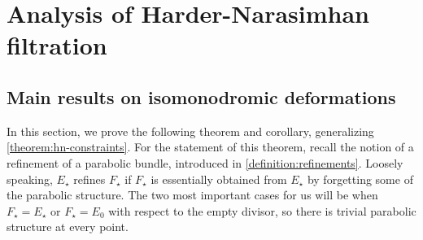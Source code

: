 \documentclass[12 pt]{amsart}
\theoremstyle{plain}
\theoremstyle{definition}
\theoremstyle{remark}
\numberwithin{equation}{section}
\begin{document}
\section{Analysis of Harder-Narasimhan filtration}
\label{section:hn-filtration}

\subsection{Main results on isomonodromic deformations} In this section, we prove the following theorem and corollary, generalizing \autoref{theorem:hn-constraints}.
For the statement of this theorem, recall the notion of a refinement of a
parabolic bundle, introduced in \autoref{definition:refinements}.
Loosely speaking, $E_\star$ refines $F_\star$ if $F_\star$ is essentially obtained
from $E_\star$ by forgetting some of the parabolic structure.
The two most
important cases for us will be when $F_\star= E_\star$
or $F_\star = E_0$ with respect to the empty divisor, so there is trivial
parabolic structure at every point.
\end{document}
